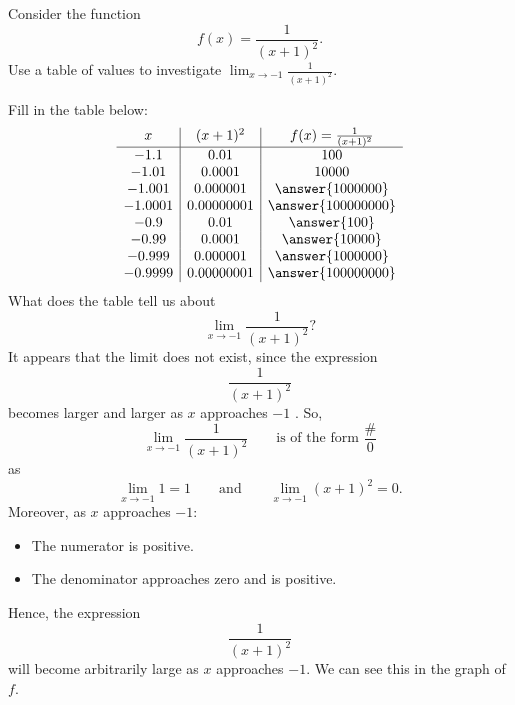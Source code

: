 \documentclass{ximera}
\begin{document}
\begin{example}
Consider the function
  \[
  f(x) = \frac{1}{(x+1)^2}.
  \]
  Use a table of values to investigate $\lim_{x\to -1} \frac{1}{(x+1)^2}$.
  \begin{explanation}
    Fill in the table below:
    \[
    \begin{array}{c|c|c}
      x & (x+1)^{2} & f(x) = \frac{1}{(x+1)^2}\\ \hline
      -1.1    & 0.01       & 100 \\
      -1.01   & 0.0001     & 10000 \\
      -1.001  & 0.000001   & \answer{1000000} \\
      -1.0001 & 0.00000001 & \answer{100000000} \\
      -0.9    & 0.01       & \answer{100} \\
      -0.99   & 0.0001     & \answer{10000} \\
      -0.999  & 0.000001   & \answer{1000000} \\
      -0.9999 & 0.00000001 & \answer{100000000} \\
    \end{array}
    \]
    What does the table tell us about 
    \[
    \lim_{x\to -1} \frac{1}{(x+1)^2}?
    \]
    It appears that the limit  does not exist, since the expression
    \[
    \frac{1}{(x+1)^2}
    \]
    becomes larger and larger as  $x$ approaches $-1$ . So,
    \[
    \lim_{x\to -1} \frac{1}{(x+1)^2}\qquad\text{is of the form } \frac{\#}{0}
    \]
    as
    \[
    \lim_{x\to -1} 1 = 1 \qquad\text{and}\qquad \lim_{x\to -1}(x+1)^2 = 0.
    \]
    Moreover, as $x$ approaches $-1$:
    \begin{itemize}
    \item The numerator is positive.
    \item The denominator approaches zero and is positive.
    \end{itemize}
    Hence, the expression
    \[
    \frac{1}{(x+1)^2}
    \]
    will become arbitrarily large as $x$ approaches $-1$.  We can see this
    in the graph of $f$.
    \begin{image}
    \end{image}
  \end{explanation}
\end{example}
\end{document}
